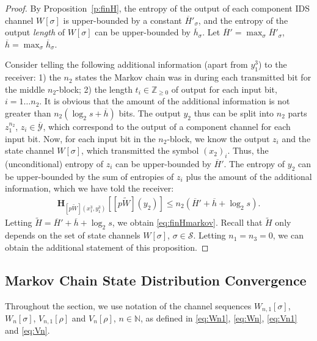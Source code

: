 \documentclass[journal, twocol]{IEEEtran}
\newcommand{\oh}{{\overline{h}}}
\newcommand{\oH}{{\overline{H}}}
\newcommand{\bfH}{{\mathbf{H}}}
\newcommand{\tH}{{\widetilde{H}}}
\newcommand{\bN}{{\mathbb{N}}}
\newcommand{\mS}{{\mathcal{S}}}
\newcommand{\tW}{{\widetilde{W}}}
\newcommand{\omY}{{\overline{\mathcal{Y}}}}
\newcommand{\bZ}{{\mathbb{Z}}}
\newcommand{\brsq}[1]{{\left[{#1}\right]}}
\newcommand{\pW}[2]{[{#1}{#2}]}
\begin{document}
\begin{proof}
By Proposition~\ref{p:finH}, the entropy of the output of each component IDS channel $W[\sigma]$ is upper-bounded by a constant $\oH'_\sigma$, and the entropy of the output \emph{length} of $W[\sigma]$ can be upper-bounded by $\oh_\sigma$.
Let $\oH'=\max_\sigma \oH'_\sigma$, $\oh=\max_\sigma \oh_\sigma$.

Consider telling the following additional information (apart from $y_1^3$) to the receiver: 1) the $n_2$ states the Markov chain was in during each transmitted bit for the middle $n_2$-block; 2) the length $t_i\in\bZ_{\geq 0}$ of output for each input bit, $i=1\dots n_2$.
It is obvious that the amount of the additional information is not greater than $n_2(\log_2s + \oh)$ bits.
The output $y_2$ thus can be split into $n_2$ parts $z_1^{n_2}$, $z_i\in \omY$, which correspond to the output of a component channel for each input bit.
Now, for each input bit in the $n_2$-block, we know the output $z_i$ and the state channel $W[\sigma]$, which transmitted the symbol $(x_2)_i$.
Thus, the (unconditional) entropy of $z_i$ can be upper-bounded by $\oH'$. 
The entropy of $y_2$ can be upper-bounded by the sum of entropies of $z_i$ plus the amount of the additional information, which we have told the receiver:
\begin{align}
\bfH_{\pW{p}{\tW}(x_1^3,y_1^3)}\brsq{\pW{p}{\tW}(y_2)} \leq n_2(\oH'+\oh+\log_2 s).
\label{eq:finHmarkov1}
\end{align}
Letting $\tH=\oH'+\oh+\log_2 s$, we obtain \eqref{eq:finHmarkov}. 
Recall that $\tH$ only depends on the set of state channels $W[\sigma]$, $\sigma\in\mS$.
Letting $n_1=n_3=0$, we can obtain the additional statement of this proposition.
\end{proof}

\subsection{Markov Chain State Distribution Convergence}
Throughout the section, we use notation of the channel sequences $W_{n,1}[\sigma]$, $W_n[\sigma]$, $V_{n,1}[\rho]$ and $V_n[\rho]$, $n\in\bN$, as defined in \eqref{eq:Wn1}, \eqref{eq:Wn}, \eqref{eq:Vn1} and \eqref{eq:Vn}.
\end{document}
